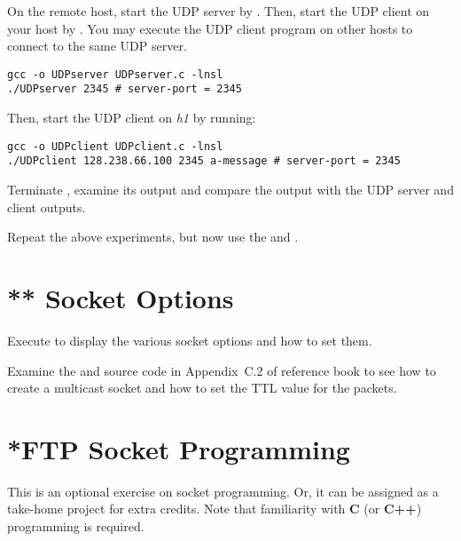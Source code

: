 \documentclass{../UTNetLab}
\begin{document}
On the remote host, start the UDP server by .
Then, start the UDP client on your host by .
You may execute the UDP client program on other hosts to connect to the same UDP server.

\begin{lstlisting}[emph={server-port}]
gcc -o UDPserver UDPserver.c -lnsl
./UDPserver 2345 # server-port = 2345
\end{lstlisting}

Then, start the UDP client on \textit{h1} by running:

\begin{lstlisting}[emph={server-port, a-message}]
gcc -o UDPclient UDPclient.c -lnsl
./UDPclient 128.238.66.100 2345 a-message # server-port = 2345
\end{lstlisting}

Terminate , examine its output and compare the output with the UDP server and client outputs.

Repeat the above experiments, but now use the  and .

\section{** Socket Options}
Execute  to display the various socket options and how to set them.

Examine the  and  source code in Appendix~C.2 of reference book to see how to create a multicast socket and how to set the TTL value for the packets.


\section{*FTP Socket Programming}
This is an optional exercise on socket programming.
Or, it can be assigned as a take-home project for extra credits.
Note that familiarity with \textbf{C} (or \textbf{C++}) programming is required.
\end{document}
